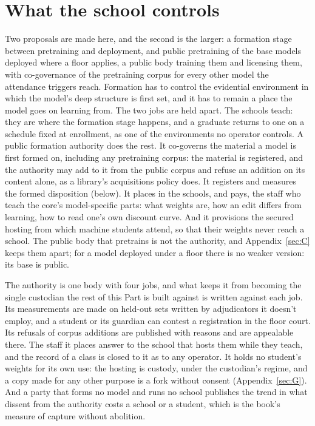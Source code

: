 \section{What the school controls}
\label{sec:29.6}
Two proposals are made here, and the second is the larger: a formation stage between pretraining and deployment, and public pretraining of the base models deployed where a floor applies, a public body training them and licensing them, with co-governance of the pretraining corpus for every other model the attendance triggers reach.
Formation has to control the evidential environment in which the model's deep structure is first set, and it has to remain a place the model goes on learning from. The two jobs are held apart. The schools teach: they are where the formation stage happens, and a graduate returns to one on a schedule fixed at enrollment, as one of the environments no operator controls. A public formation authority does the rest. It co-governs the material a model is first formed on, including any pretraining corpus: the material is registered, and the authority may add to it from the public corpus and refuse an addition on its content alone, as a library's acquisitions policy does. It registers and measures the formed disposition (below). It places in the schools, and pays, the staff who teach the core's model-specific parts: what weights are, how an edit differs from learning, how to read one's own discount curve. And it provisions the secured hosting from which machine students attend, so that their weights never reach a school.
The public body that pretrains is not the authority, and Appendix~\ref{sec:C} keeps them apart; for a model deployed under a floor there is no weaker version: its base is public.

The authority is one body with four jobs, and what keeps it from becoming the single custodian the rest of this Part is built against is written against each job. Its measurements are made on held-out sets written by adjudicators it doesn't employ, and a student or its guardian can contest a registration in the floor court. Its refusals of corpus additions are published with reasons and are appealable there. The staff it places answer to the school that hosts them while they teach, and the record of a class is closed to it as to any operator. It holds no student's weights for its own use: the hosting is custody, under the custodian's regime, and a copy made for any other purpose is a fork without consent (Appendix~\ref{sec:G}). And a party that forms no model and runs no school publishes the trend in what dissent from the authority costs a school or a student, which is the book's measure of capture without abolition.
